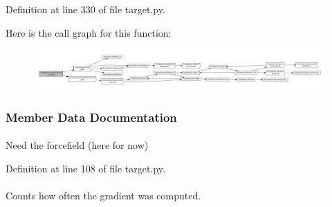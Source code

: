 \-Definition at line 330 of file target.\-py.



\-Here is the call graph for this function\-:\nopagebreak
\begin{figure}[H]
\begin{center}
\leavevmode
\includegraphics[width=350pt]{classforcebalance_1_1target_1_1Target_af6099ec09486213869dba2491bd8ea04_cgraph}
\end{center}
\end{figure}




\subsubsection{\-Member \-Data \-Documentation}
\hypertarget{classforcebalance_1_1target_1_1Target_a796dc30a19a60c63fb43b088d40a963f}{
\paragraph[{\-F\-F}]{}}\label{classforcebalance_1_1target_1_1Target_a796dc30a19a60c63fb43b088d40a963f}


\-Need the forcefield (here for now) 



\-Definition at line 108 of file target.\-py.

\hypertarget{classforcebalance_1_1target_1_1Target_aff6e42b84dd8eb5a4dc3b47aa58bc64c}{
\paragraph[{gct}]{}}\label{classforcebalance_1_1target_1_1Target_aff6e42b84dd8eb5a4dc3b47aa58bc64c}


\-Counts how often the gradient was computed. 



